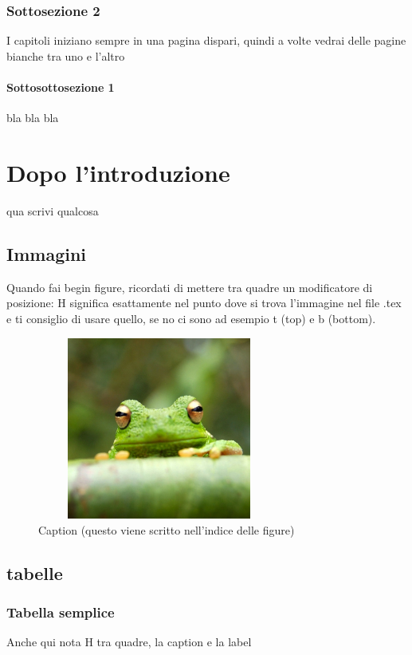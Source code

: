 \documentclass[12pt,a4paper,twoside]{book}
\begin{document}
\subsection{Sottosezione 2}
I capitoli iniziano sempre in una pagina dispari, quindi a volte vedrai delle pagine bianche tra uno e l'altro
\subsubsection{Sottosottosezione 1} \label{subsub:bla}
bla bla bla

\chapter{Dopo l'introduzione}
qua scrivi qualcosa
\section{Immagini}
Quando fai begin figure, ricordati di mettere tra quadre un modificatore di posizione: H significa esattamente nel punto dove si trova l'immagine nel file .tex e ti consiglio di usare quello, se no ci sono ad esempio t (top) e b (bottom).

\begin{figure}[H]
    \centering
    \includegraphics[height = 6cm, width=8cm]{img/frog.jpg}
    \caption{Caption (questo viene scritto nell'indice delle figure)}
    \label{fig:frog}
\end{figure}

\section{tabelle}
\subsection{Tabella semplice}
Anche qui nota H tra quadre, la caption e la label
\end{document}
